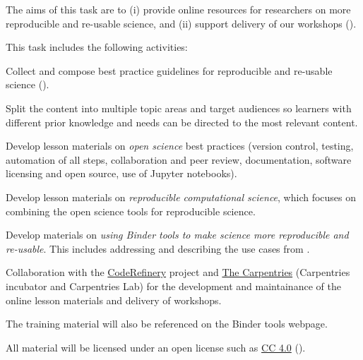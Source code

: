 \begin{task}[
  title=Best practice guidelines for reproducible science,
  id=online-resources,
  lead=UIO,
  PM=13,
  partners={SRL,MP,IFR}
]
The aims of this task are to (i) provide online resources for researchers on more reproducible
and re-usable science, and (ii) support delivery of our workshops
().

This task includes the following activities:
  \begin{compactitem}
  \item Collect and compose best practice guidelines for reproducible and
    re-usable science ().
  \item Split the content into multiple topic areas and target audiences so learners
    with different prior knowledge and needs can be directed to the most relevant content.
  \item Develop lesson materials on \emph{open science} best practices (version
    control, testing, automation of all steps, collaboration and peer review,
    documentation, software licensing and open source, use of Jupyter
    notebooks).
  \item Develop lesson materials on \emph{reproducible computational science},
    which focuses on combining the open science tools for reproducible science.
  \item Develop materials on \emph{using Binder tools to make science more
      reproducible and re-usable}. This includes addressing and describing the
    use cases from .
  \item Collaboration with the \href{https://coderefinery.org}{CodeRefinery}
    project and \href{https://carpentries.org/}{The Carpentries} (Carpentries incubator and Carpentries Lab)
    for the development and maintainance of the online lesson materials and delivery of workshops.
  \item The training material will also be referenced on the Binder tools webpage.
  \end{compactitem}
  All material will be licensed under an open license such as
  \href{https://creativecommons.org/licenses/by/4.0/}{CC 4.0}
  ().
\end{task}
